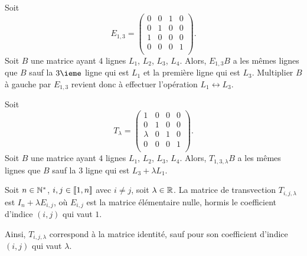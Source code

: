 \begin{exemple}
  Soit 
 \begin{equation*}
   E_{1,3} =
   \begin{pmatrix}
     0 & 0 & 1 & 0\\
     0 & 1 & 0 & 0\\
     1& 0 & 0 & 0\\
     0 & 0 & 0 & 1\\
   \end{pmatrix}.
 \end{equation*}
  Soit $B$ une matrice ayant $4$ lignes $L_{1}$, $L_{2}$, $L_{3}$, $L_{4}$. 
 Alors, $E_{1,3}B$ a les mêmes lignes que $B$ sauf la $3\ieme$ ligne qui est $L_{1}$ et la première 
ligne qui est $L_{3}$. Multiplier $B$ à gauche par $E_{1,3}$ revient donc à effectuer l'opération $L_1 \leftrightarrow L_3$.
\end{exemple}

\begin{exemple}
  Soit
   \begin{equation*}
   T_{\lambda} =
   \begin{pmatrix}
     1 & 0 & 0 & 0\\
     0 & 1 & 0 & 0\\
     \lambda & 0 & 1 & 0\\
     0 & 0 & 0 & 1\\
   \end{pmatrix}.
 \end{equation*}
 Soit $B$ une matrice ayant $4$ lignes $L_{1}$, $L_{2}$, $L_{3}$, $L_{4}$.
 Alors, $T_{1,3,\lambda}B$ a les mêmes lignes que $B$ sauf la $3$ ligne qui est $L_{3}
 + \lambda L_{1}$.
\end{exemple}
 
\begin{defi} 
  Soit $n\in\mathbb{N}^\ast$, $i,j \in [\![1,n]\!]$ avec $i\neq j$, soit $\lambda \in \mathbb{R}$. La matrice de transvection $T_{i,j,\lambda}$ est $I_n + \lambda E_{i,j}$, où $E_{i,j}$ est la matrice élémentaire nulle, hormis le coefficient d'indice $(i,j)$ qui vaut $1$.
  
  Ainsi, $T_{i,j,\lambda}$ correspond à la matrice identité, sauf pour son coefficient d'indice $(i,j)$ qui vaut $\lambda$.
\end{defi}
 
 
